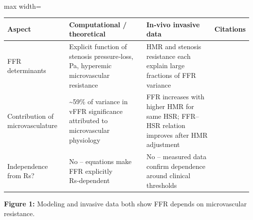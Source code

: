 \mbox{}\\
\begin{adjustbox}{max width=\textwidth}
\begin{tabular}{p{4.0cm} | p{4.0cm} | p{4.0cm} | p{4.0cm}}
\hline
Aspect & Computational / theoretical & In‑vivo invasive data & Citations \\
\hline
FFR determinants & Explicit function of stenosis pressure‑loss, Pa, hyperemic microvascular resistance & HMR and stenosis resistance each explain large fractions of FFR variance & \cite{Soto2017Fast} \cite{Garcia2019Relationship} \cite{Van De Hoef2014Impact} \\
Contribution of microvasculature & \textasciitilde{}59\% of variance in vFFR significance attributed to microvascular physiology & FFR increases with higher HMR for same HSR; FFR–HSR relation improves after HMR adjustment & \cite{Soto2017Fast} \cite{Garcia2019Relationship} \cite{Van De Hoef2014Impact} \\
Independence from Rs? & No – equations make FFR explicitly Rs‑dependent & No – measured data confirm dependence around clinical thresholds & \cite{Garcia2019Relationship} \cite{Galante2025Fractional} \cite{Van De Hoef2014Impact} \\
\hline
\end{tabular}
\end{adjustbox}


\textbf{Figure 1:} Modeling and invasive data both show FFR depends on microvascular resistance.




